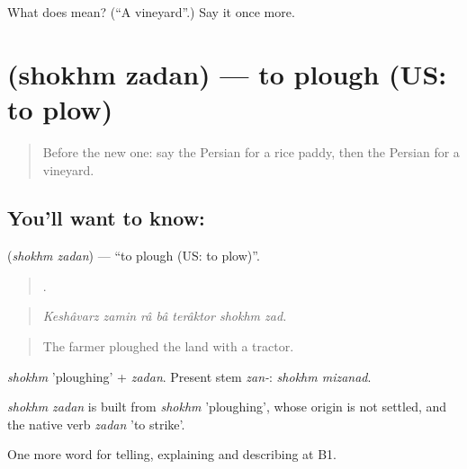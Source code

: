\begin{tcolorbox}[breakable,colback=teal!4,colframe=teal!35!black,title={Before you move on}]
What does  mean? (\textquotedblleft{}A vineyard\textquotedblright{}.) Say it once more.
\end{tcolorbox}
\section[\texorpdfstring{\fa{شخم} \fa{زدن} (shokhm zadan)}{شخم زدن (shokhm zadan)}]{  (shokhm zadan) — to plough (US: to plow)}

\label{lesson:FA-C465-shokhm-zadan}



\begin{quote}
Before the new one: say the Persian for a rice paddy, then the Persian for a vineyard.
\end{quote}

\subsection*{You'll want to know:  }
\textbf{ } (\emph{shokhm zadan}) — \textquotedblleft{}to plough (US: to plow)\textquotedblright{}.

\begin{quote}
      .
\end{quote}

\begin{quote}
\emph{Keshâvarz zamin râ bâ terâktor shokhm zad.}
\end{quote}

\begin{quote}
The farmer ploughed the land with a tractor.
\end{quote}

\emph{shokhm} 'ploughing' + \emph{zadan}. Present stem \emph{zan-}: \emph{shokhm mizanad}.

\begin{cousinweb}
\emph{shokhm zadan} is built from \emph{shokhm} 'ploughing', whose origin is not settled, and the native verb \emph{zadan} 'to strike'.
\end{cousinweb}

\begin{grammarlens}[title={What you've built}]
One more word for telling, explaining and describing at B1.
\end{grammarlens}

